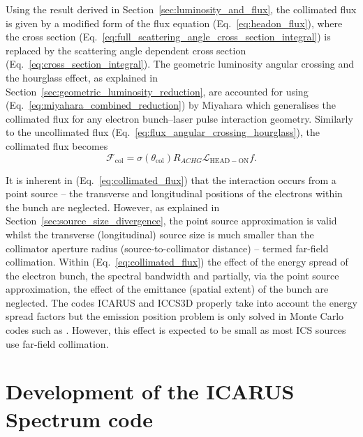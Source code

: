 \documentclass[../main.tex]{subfiles}
\begin{document}
Using the result derived in Section~\ref{sec:luminosity_and_flux}, the collimated flux is given by a modified form of the flux equation (Eq.~\ref{eq:headon_flux}), where the cross section (Eq.~\ref{eq:full_scattering_angle_cross_section_integral}) is replaced by the scattering angle dependent cross section (Eq.~\ref{eq:cross_section_integral}). The geometric luminosity angular crossing and the  hourglass effect, as explained in Section~\ref{sec:geometric_luminosity_reduction}, are accounted for using (Eq.~\ref{eq:miyahara_combined_reduction}) by Miyahara \cite{miyahara2008luminosity} which generalises the collimated flux for any electron bunch--laser pulse interaction geometry. Similarly to  the uncollimated flux (Eq.~\ref{eq:flux_angular_crossing_hourglass}), the collimated flux becomes
\begin{equation}
\mathcal{F}_{\mathrm{col}} = \sigma\left(\theta_{\mathrm{col}}\right) R_{ACHG}\mathcal{L}_{\mathrm{HEAD-ON}}f.
\label{eq:collimated_flux}
\end{equation}

It is inherent in (Eq.~\ref{eq:collimated_flux}) that the interaction occurs from a point source -- the transverse and longitudinal positions of the electrons within the bunch are neglected. However, as explained in Section~\ref{sec:source_size_divergence}, the point source approximation is valid whilst the transverse (longitudinal) source size is much smaller than the collimator aperture radius (source-to-collimator distance) -- termed far-field collimation. Within (Eq.~\ref{eq:collimated_flux}) the effect of the energy spread of the electron bunch, the spectral bandwidth and partially, via the point source approximation, the effect of the emittance (spatial extent) of the bunch are neglected. The codes \textsc{ICARUS} and \textsc{ICCS3D} \cite{krafft2016laser,ranjan2018simulation} properly take into account the energy spread factors but the emission position problem is only solved in Monte Carlo codes such as  \cite{chen1995cain}. However, this effect is expected to be small as most ICS sources use far-field collimation.

\section{Development of the ICARUS Spectrum code}
\label{sec:development_of_the_ICARUS_spectrum_code}
\end{document}
